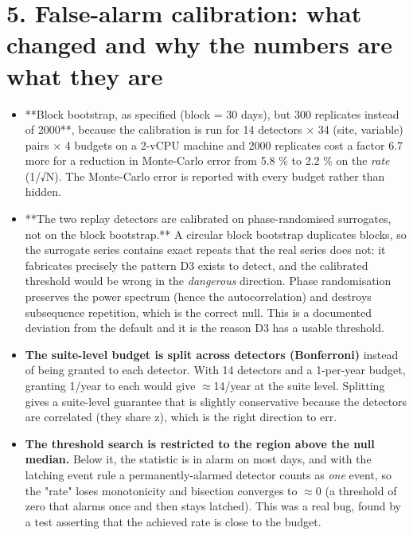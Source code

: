 \documentclass[10pt,a4paper]{article}
\begin{document}
\section*{5. False-\allowbreak{}alarm calibration: what changed and why the numbers are what they are}
\begin{itemize}
\item **Block bootstrap, as specified (block = 30 days), but 300 replicates instead
of 2000**, because the calibration is run for 14 detectors $\times$ 34 (site, variable) pairs $\times$ 4 budgets on a 2-\allowbreak{}vCPU machine and 2000 replicates cost a factor 6.7 more for a reduction in Monte-\allowbreak{}Carlo error from 5.8 \% to 2.2 \% on the \emph{rate} (1/\allowbreak{}√N). The Monte-\allowbreak{}Carlo error is reported with every budget rather than hidden.

\item **The two replay detectors are calibrated on phase-\allowbreak{}randomised surrogates, not
on the block bootstrap.** A circular block bootstrap duplicates blocks, so the surrogate series contains exact repeats that the real series does not: it fabricates precisely the pattern D3 exists to detect, and the calibrated threshold would be wrong in the \emph{dangerous} direction. Phase randomisation preserves the power spectrum (hence the autocorrelation) and destroys subsequence repetition, which is the correct null. This is a documented deviation from the default and it is the reason D3 has a usable threshold.

\item \textbf{The suite-\allowbreak{}level budget is split across detectors (Bonferroni)} instead of
being granted to each detector. With 14 detectors and a 1-\allowbreak{}per-\allowbreak{}year budget, granting 1/\allowbreak{}year to each would give $\approx$14/\allowbreak{}year at the suite level. Splitting gives a suite-\allowbreak{}level guarantee that is slightly conservative because the detectors are correlated (they share z), which is the right direction to err.

\item \textbf{The threshold search is restricted to the region above the null median.}
Below it, the statistic is in alarm on most days, and with the latching event rule a permanently-\allowbreak{}alarmed detector counts as \emph{one} event, so the "rate" loses monotonicity and bisection converges to $\approx$0 (a threshold of zero that alarms once and then stays latched). This was a real bug, found by a test asserting that the achieved rate is close to the budget.


\end{itemize}
\end{document}
